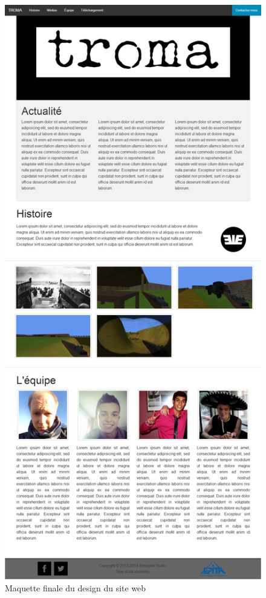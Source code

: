 \documentclass[11pt]{report}
\begin{document}
\begin{figure}[htbp]
\centering
\includegraphics[scale=0.23]{siteweb.png}
\caption{Maquette finale du design du site web}
\end{figure}
\end{document}
